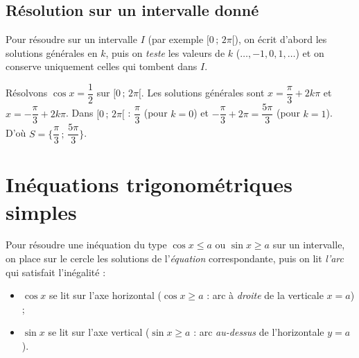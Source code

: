 \subsection{Résolution sur un intervalle donné}

\begin{aretenir}
Pour résoudre sur un intervalle $I$ (par exemple $[0\,;\,2\pi[$), on écrit d'abord
les solutions générales en $k$, puis on \emph{teste} les valeurs de $k$
($\dots,-1,0,1,\dots$) et on conserve uniquement celles qui tombent dans $I$.
\end{aretenir}

\begin{exemple}
Résolvons $\cos x=\dfrac12$ sur $[0\,;\,2\pi[$. Les solutions générales sont
$x=\dfrac{\pi}{3}+2k\pi$ et $x=-\dfrac{\pi}{3}+2k\pi$. Dans $[0\,;\,2\pi[$ :
$\dfrac{\pi}{3}$ (pour $k=0$) et $-\dfrac{\pi}{3}+2\pi=\dfrac{5\pi}{3}$ (pour $k=1$).
D'où $S=\Big\{\dfrac{\pi}{3}\,;\,\dfrac{5\pi}{3}\Big\}$.
\end{exemple}

\section{Inéquations trigonométriques simples}

\begin{aretenir}
Pour résoudre une inéquation du type $\cos x\le a$ ou $\sin x\ge a$ sur un
intervalle, on place sur le cercle les solutions de l'\emph{équation}
correspondante, puis on lit \emph{l'arc} qui satisfait l'inégalité :
\begin{itemize}
  \item $\cos x$ se lit sur l'axe horizontal ($\cos x\ge a$ : arc à \emph{droite}
        de la verticale $x=a$) ;
  \item $\sin x$ se lit sur l'axe vertical ($\sin x\ge a$ : arc \emph{au-dessus}
        de l'horizontale $y=a$).
\end{itemize}
\end{aretenir}

\begin{illus}
\fig{Figure — $\cos x\ge\frac12$ : l'arc en gras (abscisses $\ge\frac12$) correspond à $x\in\big[-\frac{\pi}{3}\,;\,\frac{\pi}{3}\big]$ sur $]-\pi\,;\,\pi]$.}
\end{illus}

